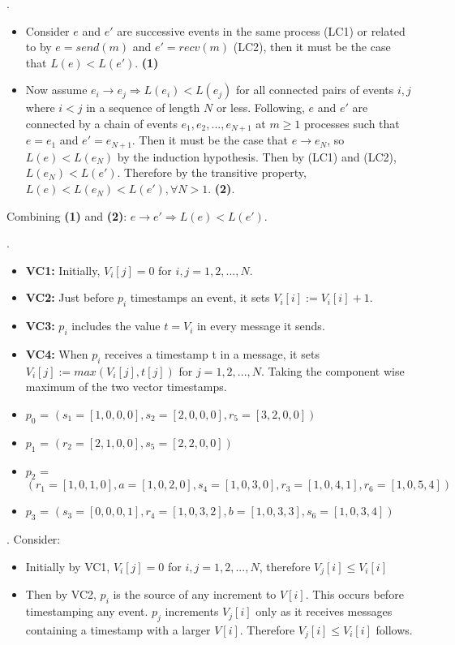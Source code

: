 \documentclass[12pt]{article}
\newcounter{question}
\newcommand{\question}[1]{
    \stepcounter{question}
    \thequestion. #1 \hfill
}
\begin{document}
\question{

\begin{itemize}
    \item Consider $e$ and $e'$ are successive events in the same process (LC1) or related to by $e = send(m)$ and $e' = recv(m)$ (LC2), then it must be the case that $L(e) < L(e')$. \textbf{(1)}
    \item Now assume $e_i \rightarrow e_j \Rightarrow L(e_i) < L(e_j)$ for all connected pairs of events $i,j$ where $i<j$ in a sequence of length $N$ or less. Following, $e$ and $e'$ are connected by a chain of events $e_1,e_2,...,e_{N+1}$ at $m \geq 1$ processes such that $e = e_1$ and $e' = e_{N+1}$. Then it must be the case that $e \rightarrow e_N$, so $L(e) < L(e_N)$ by the induction hypothesis. Then by (LC1) and (LC2), $L(e_N) < L(e')$. Therefore by the transitive property, $L(e) < L(e_N) < L(e'), \forall N>1$. \textbf{(2)}.
\end{itemize}
Combining \textbf{(1)} and \textbf{(2)}: $e \rightarrow e' \Rightarrow L(e) < L(e')$.
}

\question{
\begin{itemize}
    \item \textbf{VC1:} Initially, $V_i[j] = 0$ for $i,j = 1,2,...,N$.
    \item \textbf{VC2:} Just before $p_i$ timestamps an event, it sets $V_i[i] := V_i[i]+1$.
    \item \textbf{VC3:} $p_i$ includes the value $t = V_i$ in every message it sends.
    \item \textbf{VC4:} When $p_i$ receives a timestamp t in a message, it sets $V_i[j] := max(V_i[j], t[j])$ for $j = 1,2,...,N$. Taking the component wise maximum of the two vector timestamps.
\end{itemize}

\begin{itemize}
    \item $p_0$ = $(s_1=[1,0,0,0], s_2=[2,0,0,0], r_5 = [3,2,0,0])$
    \item $p_1$ = $(r_2=[2,1,0,0], s_5=[2,2,0,0])$
    \item $p_2$ = $(r_1=[1,0,1,0], a=[1,0,2,0], s_4=[1,0,3,0], r_3=[1,0,4,1], r_6=[1,0,5,4])$
    \item $p_3$ = $(s_3=[0,0,0,1], r_4=[1,0,3,2], b=[1,0,3,3], s_6=[1,0,3,4])$
\end{itemize}
}

\question{Consider:
\begin{itemize}
    \item Initially by VC1, $V_i[j]=0$ for $i,j = 1,2,...,N$, therefore $V_j[i] \leq V_i[i]$
    \item Then by VC2, $p_i$ is the source of any increment to $V[i]$. This occurs before timestamping any event. $p_j$ increments $V_j[i]$ only as it receives messages containing a timestamp with a larger $V[i]$. Therefore $V_j[i] \leq V_i[i]$ follows.
\end{itemize}
}
\end{document}
